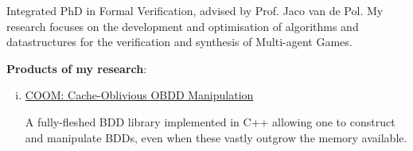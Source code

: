 
Integrated PhD in Formal Verification, advised by Prof. Jaco van de Pol. My
research focuses on the development and optimisation of algorithms and
datastructures for the verification and synthesis of Multi-agent Games.

\medskip

\textbf{Products of my research}:

\medskip

\hspace{1em}
\begin{minipage}{29.5em}
  \begin{flushleft}
    \begin{enumerate}[(i).]
      
    \item[\faCode]
      \href{http://github.com/ssoelvsten/coom}{COOM: Cache-Oblivious OBDD Manipulation}

      \smallskip

      A fully-fleshed BDD library implemented in C++ allowing one to construct
      and manipulate BDDs, even when these vastly outgrow the memory available.
      
    \end{enumerate}
  \end{flushleft}
\end{minipage}

\medskip
